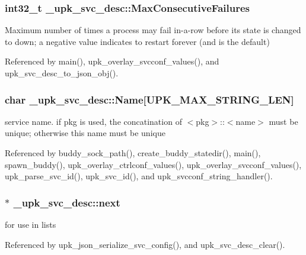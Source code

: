 \subsubsection[{MaxConsecutiveFailures}]{\setlength{\rightskip}{0pt plus 5cm}int32\_\-t {\bf \_\-upk\_\-svc\_\-desc::MaxConsecutiveFailures}}\label{struct__upk__svc__desc_aed98c59b98a6d65c435f7482fdcf7f48}
Maximum number of times a process may fail in-\/a-\/row before its state is changed to down; a negative value indicates to restart forever (and is the default) 

Referenced by main(), upk\_\-overlay\_\-svcconf\_\-values(), and upk\_\-svc\_\-desc\_\-to\_\-json\_\-obj().

\subsubsection[{Name}]{\setlength{\rightskip}{0pt plus 5cm}char {\bf \_\-upk\_\-svc\_\-desc::Name}[UPK\_\-MAX\_\-STRING\_\-LEN]}\label{struct__upk__svc__desc_a0f2c20e3e43d5677567d53b20dcc368f}
service name. if pkg is used, the concatination of $<$pkg$>$::$<$name$>$ must be unique; otherwise this name must be unique 

Referenced by buddy\_\-sock\_\-path(), create\_\-buddy\_\-statedir(), main(), spawn\_\-buddy(), upk\_\-overlay\_\-ctrlconf\_\-values(), upk\_\-overlay\_\-svcconf\_\-values(), upk\_\-parse\_\-svc\_\-id(), upk\_\-svc\_\-id(), and upk\_\-svcconf\_\-string\_\-handler().

\subsubsection[{next}]{$\ast$ {\bf \_\-upk\_\-svc\_\-desc::next}}\label{struct__upk__svc__desc_adcccb3111f5b02ff78cda29d39c827fc}
for use in lists 

Referenced by upk\_\-json\_\-serialize\_\-svc\_\-config(), and upk\_\-svc\_\-desc\_\-clear().

